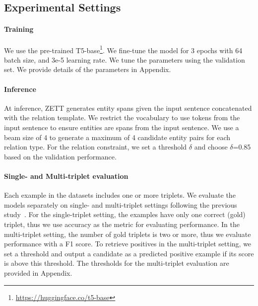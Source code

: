 \subsection{Experimental Settings}
\paragraph{Training}
We use the pre-trained T5-base\footnote{\url{https://huggingface.co/t5-base}}.
We fine-tune the model for 3 epochs with 64  batch size, and 3e-5 learning rate. We tune the parameters using the validation set. We provide details of the parameters in Appendix.

\paragraph{Inference}

At inference, ZETT generates entity spans given the input sentence concatenated with the relation template. We restrict the vocabulary to use tokens from the input sentence to ensure entities are spans from the input sentence.
We use a beam size of 4 to generate a maximum of 4 candidate entity pairs for each relation type. 
For the relation constraint, we set a threshold $\delta$ and choose $\delta$=0.85 based on the validation performance. 

\paragraph{Single- and Multi-triplet evaluation}
Each example in the datasets includes one or more triplets. We evaluate the models separately on single- and multi-triplet settings following the previous study~\cite{chia-etal-2022-relationprompt}. For the single-triplet setting, the examples have only one correct (gold) triplet, thus we use accuracy as the metric for evaluating performance.
In the multi-triplet setting, the number of gold triplets is two or more, thus we evaluate performance with a F1 score.
To retrieve positives in the multi-triplet setting, we set a threshold and output a candidate as a predicted positive example if its score is above this threshold. The thresholds for the multi-triplet evaluation are provided in Appendix.


